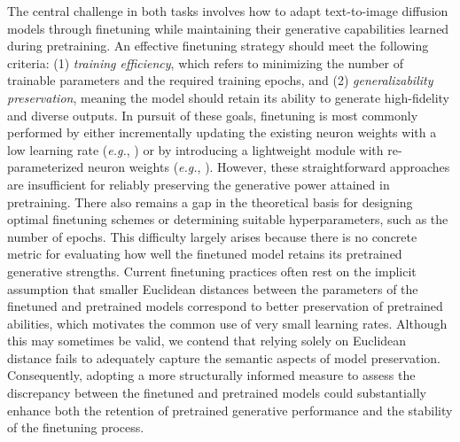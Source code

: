 The central challenge in both tasks involves how to adapt text-to-image diffusion models through finetuning while maintaining their generative capabilities learned during pretraining. An effective finetuning strategy should meet the following criteria: (1) \emph{training efficiency}, which refers to minimizing the number of trainable parameters and the required training epochs, and (2) \emph{generalizability preservation}, meaning the model should retain its ability to generate high-fidelity and diverse outputs. In pursuit of these goals, finetuning is most commonly performed by either incrementally updating the existing neuron weights with a low learning rate (\emph{e.g.}, \cite{ruiz2023dreambooth}) or by introducing a lightweight module with re-parameterized neuron weights (\emph{e.g.}, \cite{hulora2022,zhang2023adding}). However, these straightforward approaches are insufficient for reliably preserving the generative power attained in pretraining. There also remains a gap in the theoretical basis for designing optimal finetuning schemes or determining suitable hyperparameters, such as the number of epochs. This difficulty largely arises because there is no concrete metric for evaluating how well the finetuned model retains its pretrained generative strengths. Current finetuning practices often rest on the implicit assumption that smaller Euclidean distances between the parameters of the finetuned and pretrained models correspond to better preservation of pretrained abilities, which motivates the common use of very small learning rates. Although this may sometimes be valid, we contend that relying solely on Euclidean distance fails to adequately capture the semantic aspects of model preservation. Consequently, adopting a more structurally informed measure to assess the discrepancy between the finetuned and pretrained models could substantially enhance both the retention of pretrained generative performance and the stability of the finetuning process.


